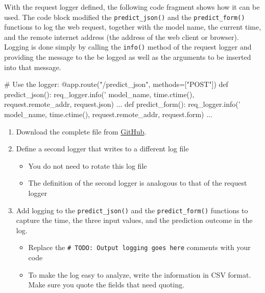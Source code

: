 \begin{withcode}
With the request logger defined, the following code fragment shows how it can be used. The code block modified the \texttt{predict\_json()} and the \texttt{predict\_form()} functions to log the web request, together with the model name, the current time, and the remote internet address (the address of the web client or browser). Logging is done simply by calling the \texttt{info()} method of the request logger and providing the message to the be logged as well as the arguments to be inserted into that message. 

\begin{pythoncode}
# Use the logger:
@app.route("/predict_json", methods=["POST"])
def predict_json():
    req_logger.info('%
                    model_name, 
                    time.ctime(), 
                    request.remote_addr, 
                    request.json)
...
def predict_form():
    req_logger.info('%
                    model_name,
                    time.ctime(),
                    request.remote_addr,
                    request.form)
...
\end{pythoncode}

\begin{exerciseboxcomputer}
\begin{enumerate}
\item Download the complete file from \href{https://github.com/jevermann/busi4720-mlops/blob/main/flask_deploy_logging.py}{GitHub}.
\item Define a second logger that writes to a different log file
\begin{itemize}
  \item You do not need to rotate this log file
  \item The definition of the second logger is analogous to that of the request logger
\end{itemize}
\item Add logging to the \texttt{predict\_json()} and the \texttt{predict\_form()} functions to capture the time, the three input values, and the prediction outcome in the log.
\begin{itemize}
   \item Replace the \texttt{\# TODO: Output logging goes here} comments with your code
   \item To make the log easy to analyze, write the information in CSV format. Make sure you quote the fields that need quoting.
\end{itemize}
\end{enumerate}
\end{exerciseboxcomputer}
\end{withcode}

